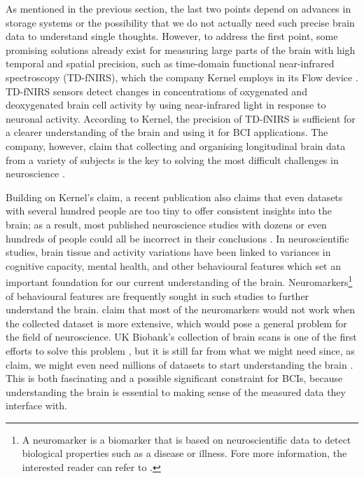 As mentioned in the previous section, the last two points depend on advances in storage systems or the possibility that we do not actually need such precise brain data to understand single thoughts. However, to address the first point, some promising solutions already exist for measuring large parts of the brain with high temporal and spatial precision, such as time-domain functional near-infrared spectroscopy (TD-fNIRS), which the company Kernel employs in its Flow device \citep{ban_kernel_2021}. TD-fNIRS sensors detect changes in concentrations of oxygenated and deoxygenated brain cell activity by using near-infrared light in response to neuronal activity. According to Kernel, the precision of TD-fNIRS is sufficient for a clearer understanding of the brain and using it for BCI applications. The company, however, claim that collecting and organising longitudinal brain data from a variety of subjects is the key to solving the most difficult challenges in neuroscience \citep{kernel_hello-humanitypdf_nodate}.

Building on Kernel’s claim, a recent publication also claims that even datasets with several hundred people are too tiny to offer consistent insights into the brain; as a result, most published neuroscience studies with dozens or even hundreds of people could all be incorrect in their conclusions \citep{marek_reproducible_2022}. In neuroscientific studies, brain tissue and activity variations have been linked to variances in cognitive capacity, mental health, and other behavioural features which set an important foundation for our current understanding of the brain. Neuromarkers\footnote{A neuromarker is a biomarker that is based on neuroscientific data to detect biological properties such as a disease or illness. Fore more information, the interested reader can refer to \citeauthor{jollans_neuromarkers_2018} \parencite*{jollans_neuromarkers_2018}.} of behavioural features are frequently sought in such studies to further understand the brain. \citeauthor{marek_reproducible_2022} \parencite*{marek_reproducible_2022} claim that most of the neuromarkers would not work when the collected dataset is more extensive, which would pose a general problem for the field of neuroscience. UK Biobank's collection of brain scans is one of the first efforts to solve this problem \citep{noauthor_imaging_nodate}, but it is still far from what we might need since, as \citeauthor{marek_reproducible_2022} \parencite*{marek_reproducible_2022} claim, we might even need millions of datasets to start understanding the brain \citep{callaway_can_2022}. This is both fascinating and a possible significant constraint for BCIs, because understanding the brain is essential to making sense of the measured data they interface with.

